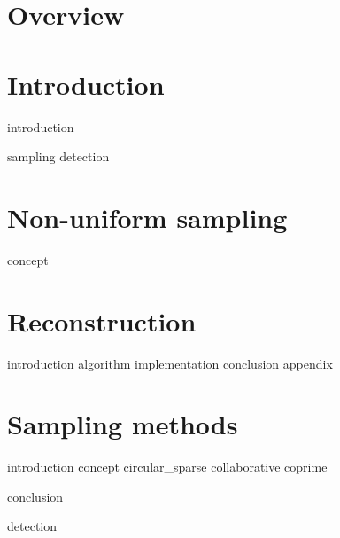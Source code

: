 \documentclass[a4paper, openany, oneside]{memoir}
\begin{document}
\chapter{Overview}

\chapter{Introduction}
\label{cha:overview}
{introduction}

{sampling}
{detection}


\chapter{Non-uniform sampling}
\label{cha:sampling}

{concept}

\chapter{Reconstruction}
\label{cha:reconstruction}

{introduction}
{algorithm}
{implementation}
{conclusion}
{appendix}

\chapter{Sampling methods}
\label{cha:sampling_methods}

{introduction}
{concept}
{circular_sparse}
{collaborative}
{coprime}

{conclusion}


{detection}
\end{document}
